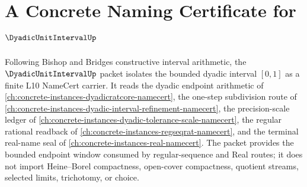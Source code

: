 \chapter{A Concrete Naming Certificate for $\DyadicUnitIntervalUp$}
\label{ch:concrete-instances-dyadic-unit-interval-namecert}

Following Bishop and Bridges constructive interval arithmetic, the $\DyadicUnitIntervalUp$ packet isolates the bounded dyadic interval $[0,1]$ as a finite L10 NameCert carrier. It reads the dyadic endpoint arithmetic of \autoref{ch:concrete-instances-dyadicratcore-namecert}, the one-step subdivision route of \autoref{ch:concrete-instances-dyadic-interval-refinement-namecert}, the precision-scale ledger of \autoref{ch:concrete-instances-dyadic-tolerance-scale-namecert}, the regular rational readback of \autoref{ch:concrete-instances-regseqrat-namecert}, and the terminal real-name seal of \autoref{ch:concrete-instances-real-namecert}. The packet provides the bounded endpoint window consumed by regular-sequence and Real routes; it does not import Heine--Borel compactness, open-cover compactness, quotient streams, selected limits, trichotomy, or choice.


